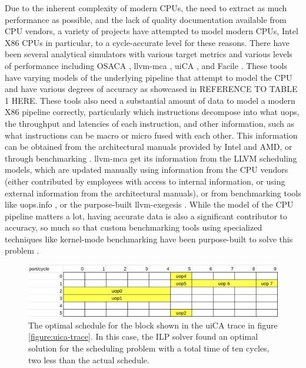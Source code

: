 \documentclass[sigconf]{acmart}
\begin{document}
Due to the inherent complexity of modern CPUs, the need to extract as much performance as possible, and the lack
of quality documentation available from CPU vendors, a variety of projects have attempted to model modern CPUs,
Intel X86 CPUs in particular, to a cycle-accurate level for these reasons. There have been several analytical
simulators with various target metrics and various levels of performance including OSACA \cite{laukemann2018osaca},
llvm-mca \cite{dibiagio2018mca}, uiCA \cite{abel2022uica}, and Facile \cite{abel2023facile}. These tools have varying
models of the underlying pipeline that attempt to model the CPU and have various degrees of accuracy as showcased in
REFERENCE TO TABLE 1 HERE. These tools also need a substantial amount of data to model a modern X86 pipeline correctly,
particularly which instructions decompose into what uops, the throughput and latencies of each instruction, and other
information, such as what instructions can be macro or micro fused with each other. This information can be obtained
from the architectural manuals provided by Intel and AMD, or through benchmarking \cite{abel2019uopsinfo}
\cite{courbet2018exegesis}. llvm-mca get its information from the LLVM \cite{lattner2004llvm} scheduling models,
which are updated manually using information from the CPU vendors (either contributed by employees with access to
internal information, or using external information from the architectural manuals), or from benchmarking tools
like uops.info \cite{abel2019uopsinfo}, or the purpose-built llvm-exegesis \cite{courbet2018exegesis}. While the model
of the CPU pipeline matters a lot, having accurate data is also a significant contributor to accuracy, so much so
that custom benchmarking tools using specialized techniques like kernel-mode benchmarking have been purpose-built to
solve this problem \cite{abel2020nanobench}.

\begin{figure}[t]
  \centering
  \includegraphics[width=\linewidth]{optimal_schedule.png}
  \caption{The optimal schedule for the block shown in the uiCA trace in figure \ref{figure:uica-trace}. In this case,
  the ILP solver found an optimal solution for the scheduling problem with a total time of ten cycles, two less than
  the actual schedule.}
  \label{figure:optimal-schedule}
\end{figure}
\end{document}
